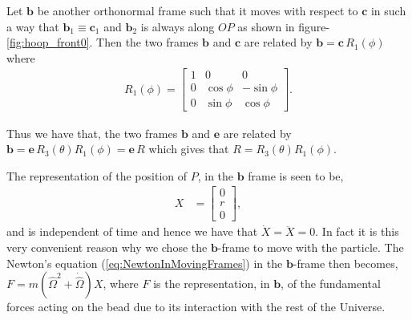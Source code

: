 \documentclass[graybox,envcountchap,sectrefs]{svmonoMuga}
\begin{document}
Let $\mathbf{b}$
be another orthonormal frame such that it moves with respect to $\mathbf{c}$ in such a way that $\mathbf{b}_1\equiv \mathbf{c}_1$ and $\mathbf{b}_2$ is always along $OP$ as shown in figure-\ref{fig:hoop_front0}.
Then the two frames $\mathbf{b}$ and $\mathbf{c}$ are related by $\mathbf{b}=\mathbf{c}\,R_1(\phi)$ where
\begin{align*}
R_1(\phi)=\begin{bmatrix}
1&0&0\\
0&\cos{\phi}&-\sin{\phi}\\
0&\sin{\phi}&\cos{\phi}
\end{bmatrix}.
\end{align*}

Thus we have that, the two frames $\mathbf{b}$ and $\mathbf{e}$ are related by $\mathbf{b}=\mathbf{e}\,R_3(\theta)R_1(\phi)=\mathbf{e}\,R$ which gives that $R=R_3(\theta)R_1(\phi)$.

The representation of the position of $P$, in the $\mathbf{b}$ frame is seen to be, 
\begin{align*}
X&=\begin{bmatrix}
0\\r\\0
\end{bmatrix},
\end{align*}
and is independent of time and hence we have that $\dot{X}=\ddot{X}=0$. In fact it is this very convenient reason why we chose the $\mathbf{b}$-frame to move with the particle.
The Newton's equation (\ref{eq:NewtonInMovingFrames}) in the $\mathbf{b}$-frame then becomes, $F=m(\widehat{\Omega}^2+\dot{\widehat{\Omega}})X$,
where $F$ is the representation, in $\mathbf{b}$, of the fundamental forces acting on the bead due to its interaction with the rest of the Universe.
\end{document}
